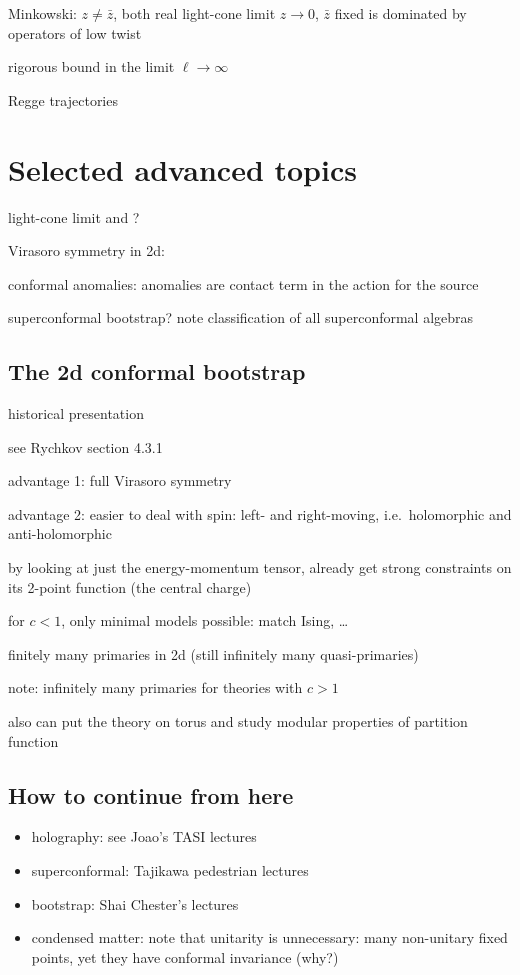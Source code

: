\documentclass[a4paper,12pt]{article}
\numberwithin{equation}{section}
\begin{document}
Minkowski: $z \neq \bar{z}$, both real 
light-cone limit $z \to 0$, $\bar{z}$ fixed is dominated by operators of low twist 

rigorous bound in the limit $\ell \to \infty$

Regge trajectories





\section{Selected advanced topics}

light-cone limit and ?

Virasoro symmetry in 2d:


conformal anomalies: anomalies are contact term in the action for the source


superconformal bootstrap? note classification of all superconformal algebras


\subsection{The 2d conformal bootstrap}

historical presentation

see Rychkov section 4.3.1

advantage 1:
full Virasoro symmetry

advantage 2:
easier to deal with spin: left- and right-moving, i.e.~holomorphic and anti-holomorphic

by looking at just the energy-momentum tensor, already get strong constraints on its 2-point function (the central charge)

for $c < 1$, only minimal models possible:
match Ising, \ldots

finitely many primaries in 2d (still infinitely many quasi-primaries)

note: infinitely many primaries for theories with $c > 1$

also can put the theory on torus and study modular properties of partition function


\subsection{How to continue from here}


\begin{itemize}

\item
holography: see Joao's TASI lectures

\item
superconformal: Tajikawa pedestrian lectures

\item
bootstrap: Shai Chester's lectures

\item
condensed matter:
note that unitarity is unnecessary: many non-unitary fixed points, yet they have conformal invariance (why?)

\end{itemize}





\end{document}
